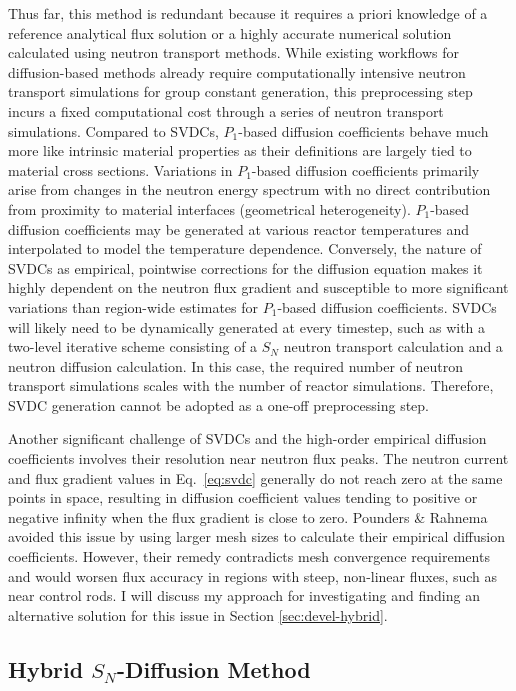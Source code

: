 Thus far, this method is redundant because it requires a priori knowledge of a reference
analytical flux solution or a highly accurate numerical solution calculated using neutron
transport methods. While existing workflows for diffusion-based methods already require
computationally intensive neutron transport simulations for group constant generation, this
preprocessing step incurs a fixed computational cost through
a series of neutron transport simulations. Compared to \glspl{SVDC}, $P_1$-based diffusion
coefficients behave much more like intrinsic material properties as their definitions are largely
tied to material cross sections. Variations in $P_1$-based diffusion coefficients primarily arise
from changes in the neutron energy spectrum with no direct contribution from proximity to material
interfaces (geometrical heterogeneity). $P_1$-based diffusion coefficients may be generated at
various reactor temperatures and interpolated to model the temperature dependence. Conversely, the
nature of \glspl{SVDC} as empirical, pointwise corrections for the diffusion equation
makes it highly dependent on the neutron flux gradient and susceptible to more significant
variations than region-wide estimates for $P_1$-based diffusion coefficients. \glspl{SVDC} will
likely need to be dynamically generated at every timestep, such as with a two-level iterative
scheme consisting of a $S_N$ neutron transport calculation and a neutron
diffusion calculation. In this case, the required number of neutron transport simulations scales
with the number of reactor simulations. Therefore, \gls{SVDC} generation cannot be adopted as a
one-off preprocessing step. 

Another significant challenge of \glspl{SVDC} and the high-order empirical diffusion coefficients
involves their resolution near neutron flux peaks. The neutron current and flux gradient values in
Eq.\ \ref{eq:svdc} generally do not reach zero at the same points in space,
resulting in diffusion coefficient values tending to positive or negative infinity when the
flux gradient is close to zero. Pounders \& Rahnema avoided this issue by using
larger mesh sizes to calculate their empirical diffusion coefficients. However, their
remedy contradicts mesh convergence requirements and would worsen flux accuracy in regions with
steep, non-linear fluxes, such as near control rods. I will discuss my approach for investigating
and finding an alternative solution for this issue in Section \ref{sec:devel-hybrid}.

\subsection{Hybrid $S_N$-Diffusion Method} \label{sec:hybrid-method}

